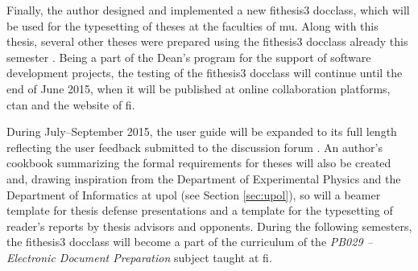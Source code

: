 \documentclass[12pt,twoside,color,table]%
  {fithesis3/fithesis3} %
\begin{document}
Finally, the author designed and implemented a new
\textsf{fithesis3} \gls{docclass}, which will be used for the
typesetting of theses at the faculties of \gls{mu}. Along with this
thesis, several other theses were prepared using the
\textsf{fithesis3} \gls{docclass} already this semester
\cite{kovanda15,zvolanek15,rucka15}. Being a part of the Dean's
program for the support of software development projects, the
testing of the \textsf{fithesis3} \gls{docclass} will continue
until the end of June 2015, when it will be published at online
collaboration platforms, \gls{ctan} and the website of \gls{fi}.

During July--September 2015, the user guide will be expanded to its
full length reflecting the user feedback submitted to the
discussion forum \cite{fithesisForum}. An author's cookbook
summarizing the formal requirements for theses will also be created
and, drawing inspiration from the Department of Experimental
Physics and the Department of Informatics at \gls{upol} (see
Section \ref{sec:upol}), so will a \gls{beamer} template for thesis
defense presentations and a template for the typesetting of
reader's reports by thesis advisors and opponents. During the
following semesters, the \textsf{fithesis3} \gls{docclass} will
become a part of the curriculum of the \emph{PB029 -- Electronic
Document Preparation} subject taught at \gls{fi}.
\end{document}
